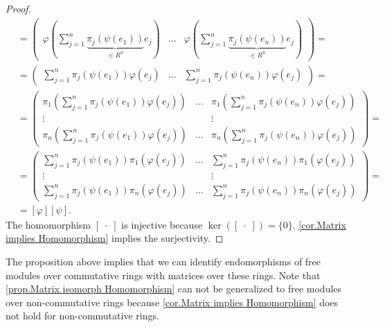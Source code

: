 \begin{proof}
\begin{align*}
&=\begin{pmatrix}\varphi(\sum_{j=1}^n\underbrace{\pi_j(\psi(e_1))}_{\in R^n}e_j) & \ldots & \varphi(\sum_{j=1}^n\underbrace{\pi_j(\psi(e_n))}_{\in R^n}e_j)\end{pmatrix}=\\
&=\begin{pmatrix}\sum_{j=1}^n\pi_j(\psi(e_1))\varphi(e_j) & \ldots & \sum_{j=1}^n\pi_j(\psi(e_n))\varphi(e_j)\end{pmatrix}=\\
&=\begin{pmatrix}
\pi_1(\sum_{j=1}^n\pi_j(\psi(e_1))\varphi(e_j)) & \ldots & \pi_1(\sum_{j=1}^n\pi_j(\psi(e_n))\varphi(e_j))\\
\vdots & &\vdots\\
\pi_n(\sum_{j=1}^n\pi_j(\psi(e_1))\varphi(e_j)) & \ldots & \pi_n(\sum_{j=1}^n\pi_j(\psi(e_n))\varphi(e_j))
\end{pmatrix}=\\
&=\begin{pmatrix}
\sum_{j=1}^n\pi_j(\psi(e_1))\pi_1(\varphi(e_j)) & \ldots & \sum_{j=1}^n\pi_j(\psi(e_n))\pi_1(\varphi(e_j))\\
\vdots & &\vdots\\
\sum_{j=1}^n\pi_j(\psi(e_1))\pi_n(\varphi(e_j)) & \ldots & \sum_{j=1}^n\pi_j(\psi(e_n))\pi_n(\varphi(e_j))
\end{pmatrix}=\\
&=[\varphi][\psi].
\end{align*}
The homomorphism $[\;\cdot\;]$ is injective because $\ker([\;\cdot\;])=\lbrace 0\rbrace$. \cref{cor.Matrix implies Homomorphism} implies the surjectivity.
\end{proof}

The proposition above implies that we can identify endomorphisms of free modules over commutative rings with matrices over these rings. Note that \cref{prop.Matrix isomorph Homomorphism} can not be generalized to free modules over non-commutative rings because  \cref{cor.Matrix implies Homomorphism} does not hold for non-commutative rings.
